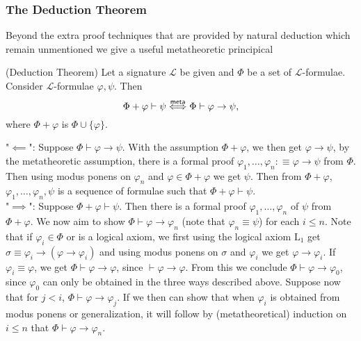 \subsubsection{The Deduction Theorem}
Beyond the extra proof techniques that are provided by natural deduction which remain unmentioned we give a useful metatheoretic principical 
\begin{theorem}(Deduction Theorem)
    Let a signature $\mathcal{L}$ be given and $\Phi$ be a set of $\mathcal{L}$-formulae. Consider $\mathcal{L}$-formulae $\varphi,\psi$. Then 
    $$\Phi+\varphi \vdash \psi \mathrel{\overset{\mathsf{meta}}{\Longleftrightarrow}} \Phi \vdash \varphi\to \psi,$$
    where $\Phi+\varphi$ is $\Phi\cup\{\varphi\}.$
\end{theorem}
\begin{proofsketch}
    "$\impliedby$": Suppose $\Phi\vdash \varphi\to \psi$. With the assumption $\Phi+\varphi$, we then get $\varphi\to \psi$, by the metatheoretic assumption, there is a formal proof $\varphi_1,\dots,\varphi_n:\equiv \varphi\to \psi$ from $\Phi$. Then using modus ponens on $\varphi_n$ and $\varphi\in \Phi+\varphi$ we get $\psi$. Then from $\Phi+\varphi$, $\varphi_1,\dots,\varphi_n,\psi$ is a sequence of formulae such that $\Phi+\varphi \vdash \psi$.\\
    "$\implies$": Suppose $\Phi+\varphi\vdash \psi$. Then there is a formal proof $\varphi_1,\dots,\varphi_n$ of $\psi$ from $\Phi+\varphi$. We now aim to show $\Phi \vdash \varphi\to \varphi_n$ (note that $\varphi_n\equiv \psi$) for each $i\leq n$. Note that if $\varphi_i\in \Phi$ or is a logical axiom, we first using the logical axiom $\mathrm{L}_1$ get $\sigma\equiv \varphi_i \to (\varphi\to \varphi_i)$ and using modus ponens on $\sigma$ and $\varphi_i$ we get $\varphi\to \varphi_i$. If $\varphi_i\equiv \varphi$, we get $\Phi\vdash \varphi\to\varphi$, since $\vdash \varphi\to \varphi$. From this we conclude $\Phi\vdash \varphi\to \varphi_0$, since $\varphi_0$ can only be obtained in the three ways described above. Suppose now that for $j< i$, $\Phi\vdash \varphi\to \varphi_j$. If we then can show that when $\varphi_i$ is obtained from modus ponens or generalization, it will follow by (metatheoretical) induction on $i\leq n$ that $\Phi\vdash \varphi\to\varphi_n$.
\end{proofsketch}

